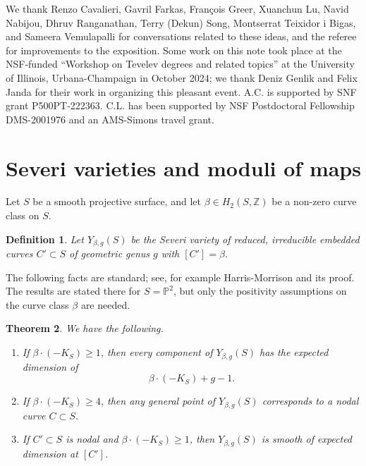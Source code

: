 \documentclass[12pt]{amsart}
\def\Z{\mathbb{Z}}
\def\P{\mathbb{P}}
\newtheorem{definition}{Definition}[section]
\newtheorem{theorem}[definition]{Theorem}
\begin{document}
We thank Renzo Cavalieri, Gavril Farkas, François Greer, Xuanchun Lu, Navid Nabijou, Dhruv Ranganathan, Terry (Dekun) Song, Montserrat Teixidor i Bigas, and Sameera Vemulapalli for conversations related to these ideas, and the referee for improvements to the exposition. Some work on this note took place at the NSF-funded ``Workshop on Tevelev degrees and related topics'' at the University of Illinois, Urbana-Champaign in October 2024; we thank Deniz Genlik and Felix Janda for their work in organizing this pleasant event. A.C. is supported by SNF grant P500PT-222363. C.L. has been supported by NSF Postdoctoral Fellowship DMS-2001976 and an AMS-Simons travel grant.

\section{Severi varieties and moduli of maps}\label{sec:severivarieties}

 Let $S$ be a smooth projective surface, and let $\beta\in H_2(S,\Z)$ be a non-zero curve class on $S$. 
 
 \begin{definition}
     Let $Y_{\beta,g}(S)$ be the Severi variety of reduced, irreducible embedded curves $C'\subset S$ of geometric genus $g$ with $[C']=\beta$. 
 \end{definition}
 
 The following facts are standard; see, for example Harris-Morrison \cite[Corollary 3.42]{book-HM} and its proof. The results are stated there for $S=\P^2$, but only the positivity assumptions on the curve class $\beta$ are needed.

\begin{theorem}\label{severi_thm}
    We have the following.
    \begin{enumerate}
     \item[(i)] If $\beta\cdot (-K_S)\ge 1$, then every component of $Y_{\beta,g}(S)$ has the expected dimension of 
     \begin{equation*}
         \beta\cdot (-K_S)+g-1.
     \end{equation*}
     \item[(ii)] If $\beta\cdot (-K_S)\ge 4$, then any general point of $Y_{\beta,g}(S)$ corresponds to a nodal curve $C\subset S$.
     \item[(iii)] If $C'\subset S$ is nodal and $\beta\cdot (-K_S)\ge 1$, then $Y_{\beta,g}(S)$ is smooth of expected dimension at $[C']$.
     \end{enumerate}
\end{theorem}
\end{document}
